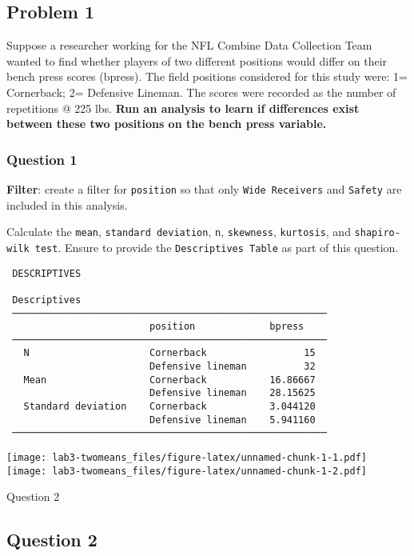 \documentclass[
]{article}
\begin{document}
\hypertarget{problem-1}{%
\subsection{Problem 1}\label{problem-1}}

Suppose a researcher working for the NFL Combine Data Collection Team
wanted to find whether players of two different positions would differ
on their bench press scores (bpress). The field positions considered for
this study were: 1= Cornerback; 2= Defensive Lineman. The scores were
recorded as the number of repetitions @ 225 lbs. \textbf{Run an analysis
to learn if differences exist between these two positions on the bench
press variable.}

\hypertarget{question-1}{%
\subsubsection{Question 1}\label{question-1}}

\textbf{Filter}: create a filter for \texttt{position} so that only
\texttt{Wide\ Receivers} and \texttt{Safety} are included in this
analysis.

Calculate the \texttt{mean}, \texttt{standard\ deviation}, \texttt{n},
\texttt{skewness}, \texttt{kurtosis}, and \texttt{shapiro-wilk\ test}.
Ensure to provide the \texttt{Descriptives\ Table} as part of this
question.

\begin{verbatim}
 DESCRIPTIVES

 Descriptives                                            
 ─────────────────────────────────────────────────────── 
                         position             bpress     
 ─────────────────────────────────────────────────────── 
   N                     Cornerback                 15   
                         Defensive lineman          32   
   Mean                  Cornerback           16.86667   
                         Defensive lineman    28.15625   
   Standard deviation    Cornerback           3.044120   
                         Defensive lineman    5.941160   
 ─────────────────────────────────────────────────────── 
\end{verbatim}

\texttt{[image: lab3-twomeans\_files/figure-latex/unnamed-chunk-1-1.pdf]}
\texttt{[image: lab3-twomeans\_files/figure-latex/unnamed-chunk-1-2.pdf]}

Question 2

\hypertarget{question-2}{%
\subsection{Question 2}\label{question-2}}
\end{document}
